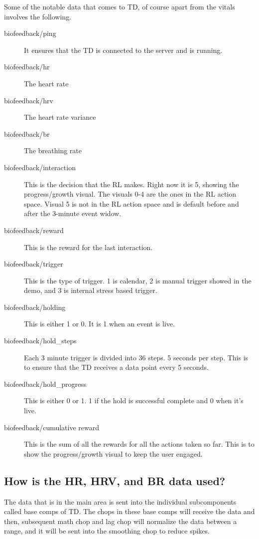 \documentclass[
	fontsize=15pt,
	twoside=false,
	secnumdepth=2
]{kaobook}
\begin{document}
Some of the notable data that comes to TD, of course apart from the vitals involves the following. 
\begin{description}
  \item[biofeedback/ping] It ensures that the TD is connected to the server and is running. 
  \item[biofeedback/hr] The heart rate
  \item[biofeedback/hrv] The heart rate variance
  \item[biofeedback/br] The breathing rate
  \item[biofeedback/interaction] This is the decision that the RL makes. Right now it is 5, showing the progress/growth visual. The visuals 0-4 are the ones in the RL action space. Visual 5 is not in the RL action space and is default before and after the 3-minute event widow. 
  \item[biofeedback/reward] This is the reward for the last interaction. 
  \item[biofeedback/trigger] This is the type of trigger. 1 is calendar, 2 is manual trigger showed in the demo, and 3 is internal stress based trigger. 
  \item[biofeedback/holding] This is either 1 or 0. It is 1 when an event is live.  
  \item[biofeedback/hold\_steps] Each 3 minute trigger is divided into 36 steps. 5 seconds per step. This is to ensure that the TD receives a data point every 5 seconds. 
  \item[biofeedback/hold\_progress] This is either 0 or 1. 1 if the hold is successful complete and 0 when it's live.
  \item[biofeedback/cumulative reward] This is the sum of all the rewards for all the actions taken so far. This is to show the progress/growth visual to keep the user engaged.    
\end{description}

\subsection{How is the HR, HRV, and BR data used?}

The data that is in the main area is sent into the individual subcomponents called base comps of TD. The chops in these base comps will receive the data and then, subsequent math chop and lag chop will normalize the data between a range, and it will be sent into the smoothing chop to reduce spikes. \\
\end{document}
